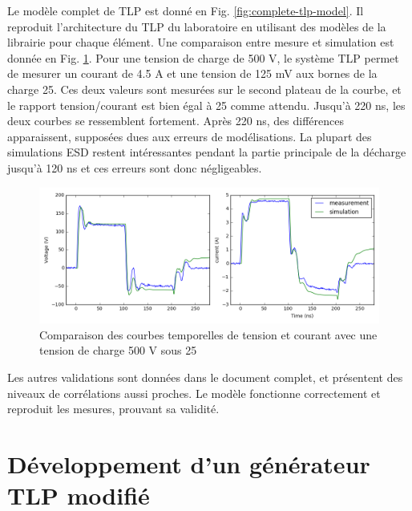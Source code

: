 Le modèle complet de TLP est donné en Fig. \ref{fig:complete-tlp-model}.
Il reproduit l'architecture du TLP du laboratoire en utilisant des modèles de la librairie pour chaque élément.
Une comparaison entre mesure et simulation est donnée en Fig. \ref{fig:comparison-tlp-load}.
Pour une tension de charge de 500 V, le système TLP permet de mesurer un courant de 4.5 A et une tension de 125 mV aux bornes de la charge 25\textOmega{}.
Ces deux valeurs sont mesurées sur le second plateau de la courbe, et le rapport tension/courant est bien égal à 25\textOmega{} comme attendu.
Jusqu'à 220 ns, les deux courbes se ressemblent fortement.
Après 220 ns, des différences apparaissent, supposées dues aux erreurs de modélisations.
La plupart des simulations ESD restent intéressantes pendant la partie principale de la décharge jusqu'à 120 ns et ces erreurs sont donc négligeables.

\begin{figure}[!h]
  \centering
  \includegraphics[width=\textwidth]{src/1/figures/tlp_comparison_R25_500V.png}
  \caption{Comparaison des courbes temporelles de tension et courant avec une  tension de charge 500 V sous 25\textOmega{}}
  \label{fig:comparison-tlp-load}
\end{figure}

Les autres validations sont données dans le document complet, et présentent des niveaux de corrélations aussi proches.
Le modèle fonctionne correctement et reproduit les mesures, prouvant sa validité.

\section{Développement d'un générateur TLP modifié}

